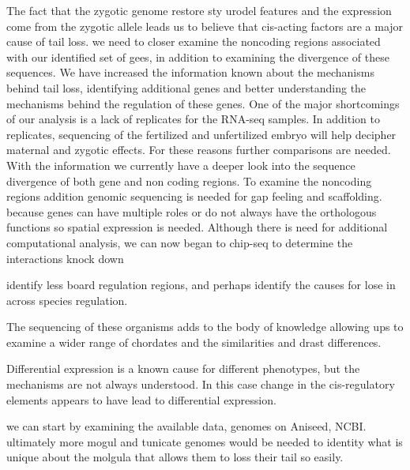  The fact that the zygotic genome restore sty urodel features and the expression come from the zygotic allele leads us to believe that cis-acting factors are  a major cause of tail loss. we need to closer examine the noncoding regions associated with our identified set of gees, in addition to examining the divergence of these sequences. We have increased the information known about the mechanisms behind tail loss, identifying additional genes and better understanding the mechanisms behind the regulation of these genes. One of the major shortcomings of our analysis is a lack of replicates for the RNA-seq samples.   In addition to replicates, sequencing of the fertilized and unfertilized embryo will help decipher maternal and zygotic effects.
 For these reasons further comparisons are needed. With the information we currently have a deeper look into the sequence divergence of both gene and non coding regions. To examine the noncoding regions addition genomic sequencing is needed for gap feeling and scaffolding.
because genes can have multiple roles or do not always have the orthologous functions so spatial expression is needed.
Although there is need for additional computational analysis, we can now began to 
chip-seq to determine the interactions
knock down



identify less board regulation regions, and perhaps identify the causes for lose in across species regulation.

The sequencing of these organisms adds to the body of knowledge allowing ups to examine a wider range of chordates and the similarities and drast differences. 


Differential expression is a known cause for different phenotypes, but the mechanisms are not always understood. In this case change in the cis-regulatory elements appears to have lead to differential expression.







 we can start by examining the available data, genomes on Aniseed, NCBI. ultimately more mogul and tunicate genomes would be needed to identity what is unique about the molgula that allows them to loss their tail so easily.  
